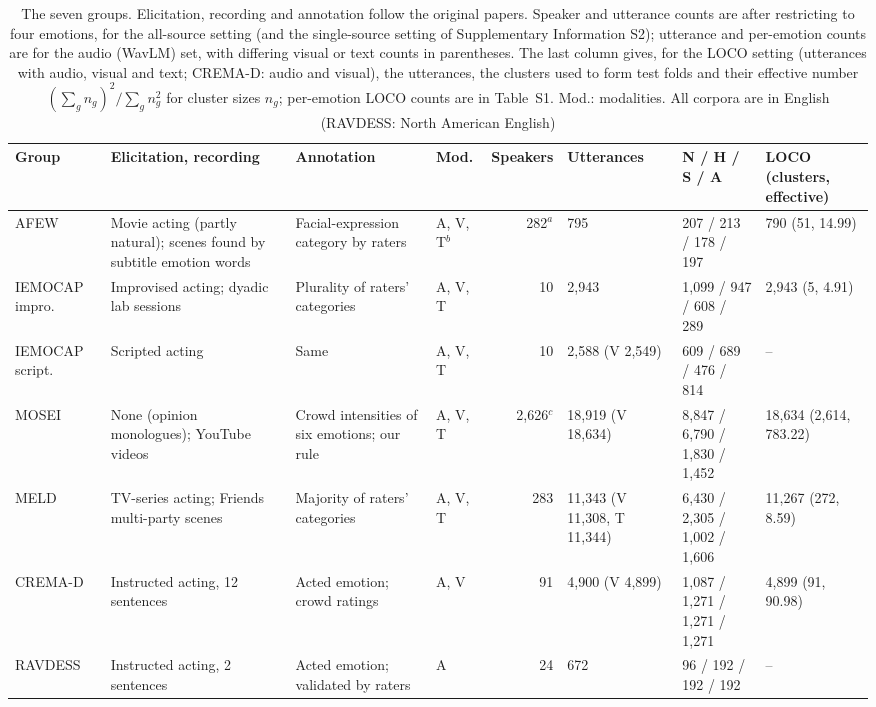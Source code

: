 \begin{table}[t]
\caption{The seven groups. Elicitation, recording and annotation follow the original papers. Speaker and utterance counts are after restricting to four emotions, for the all-source setting (and the single-source setting of Supplementary Information S2); utterance and per-emotion counts are for the audio (WavLM) set, with differing visual or text counts in parentheses. The last column gives, for the LOCO setting (utterances with audio, visual and text; CREMA-D: audio and visual), the utterances, the clusters used to form test folds and their effective number $(\sum_g n_g)^2/\sum_g n_g^2$ for cluster sizes $n_g$; per-emotion LOCO counts are in Table~S1. Mod.: modalities. All corpora are in English (RAVDESS: North American English)}\label{tab:corpora}
\footnotesize\setlength{\tabcolsep}{3pt}
\begin{tabular}{@{}p{1.55cm}p{1.7cm}p{1.95cm}p{0.75cm}r p{1.5cm}p{1.7cm}p{1.35cm}@{}}
\toprule
Group & Elicitation, recording & Annotation & Mod. & Speakers & Utterances & N / H / S / A & LOCO (clusters, effective) \\
\midrule
AFEW \cite{dhall2012afew,dhall2013emotiw} & Movie acting (partly natural); scenes found by subtitle emotion words & Facial-expression category by raters & A, V, T$^{b}$ & 282$^{a}$ & 795 & 207 / 213 / 178 / 197 & 790 (51, 14.99) \\
IEMOCAP impro.\ \cite{busso2008iemocap} & Improvised acting; dyadic lab sessions & Plurality of raters' categories & A, V, T & 10 & 2,943 & 1,099 / 947 / 608 / 289 & 2,943 (5, 4.91) \\
IEMOCAP script.\ \cite{busso2008iemocap} & Scripted acting & Same & A, V, T & 10 & 2,588 (V 2,549) & 609 / 689 / 476 / 814 & -- \\
MOSEI \cite{zadeh2018mosei} & None (opinion monologues); YouTube videos & Crowd intensities of six emotions; our rule & A, V, T & 2,626$^{c}$ & 18,919 (V 18,634) & 8,847 / 6,790 / 1,830 / 1,452 & 18,634 (2,614, 783.22) \\
MELD \cite{poria2019meld} & TV-series acting; Friends multi-party scenes & Majority of raters' categories & A, V, T & 283 & 11,343 (V 11,308, T 11,344) & 6,430 / 2,305 / 1,002 / 1,606 & 11,267 (272, 8.59) \\
CREMA-D \cite{cao2014cremad} & Instructed acting, 12 sentences & Acted emotion; crowd ratings & A, V & 91 & 4,900 (V 4,899) & 1,087 / 1,271 / 1,271 / 1,271 & 4,899 (91, 90.98) \\
RAVDESS \cite{livingstone2018ravdess} & Instructed acting, 2 sentences & Acted emotion; validated by raters & A & 24 & 672 & 96 / 192 / 192 / 192 & -- \\

\end{tabular}
\end{table}
